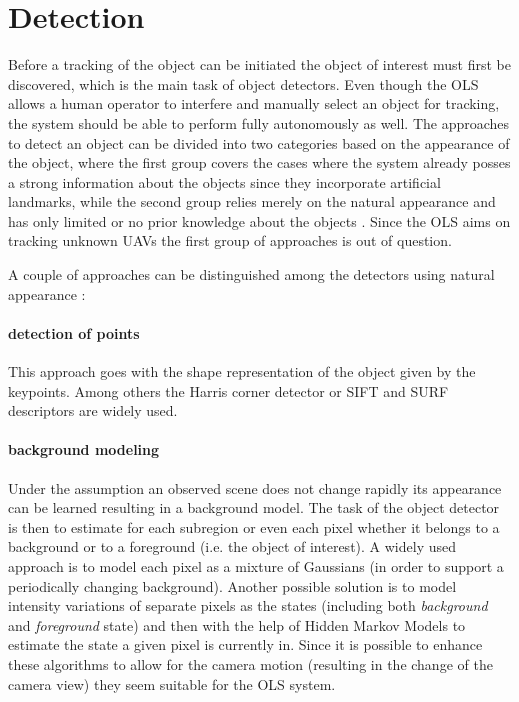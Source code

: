 \section{Detection}

Before a tracking of the object can be initiated the object of interest must first be discovered, which is the main task of object detectors. Even though the OLS allows a human operator to interfere and manually select an object for tracking, the system should be able to perform fully autonomously as well. The approaches to detect an object can be divided into two categories based on the appearance of the object, where the first group covers the cases where the system already posses a strong information about the objects since they incorporate artificial landmarks, while the second group relies merely on the natural appearance and has only limited or no prior knowledge about the objects \cite{Multi-Camera_Sensor_System_for_3D_Segmentation}. Since the OLS aims on tracking unknown UAVs the first group of approaches is out of question.

A couple of approaches can be distinguished among the detectors using natural appearance \cite{Yilmaz:2006:OTS:1177352.1177355}:

\paragraph{detection of points} This approach goes with the shape representation of the object given by the keypoints. Among others the Harris corner detector or SIFT and SURF descriptors are widely used.

\paragraph{background modeling} Under the assumption an observed scene does not change rapidly its appearance can be learned resulting in a background model. The task of the object detector is then to estimate for each subregion or even each pixel whether it belongs to a background or to a foreground (i.e. the object of interest). A widely used approach is to model each pixel as a mixture of Gaussians (in order to support a periodically changing background). Another possible solution is to model intensity variations of separate pixels as the states (including both \textit{background} and \textit{foreground} state) and then with the help of Hidden Markov Models to estimate the state a given pixel is currently in. Since it is possible to enhance these algorithms to allow for the camera motion (resulting in the change of the camera view) they seem suitable for the OLS system. 

